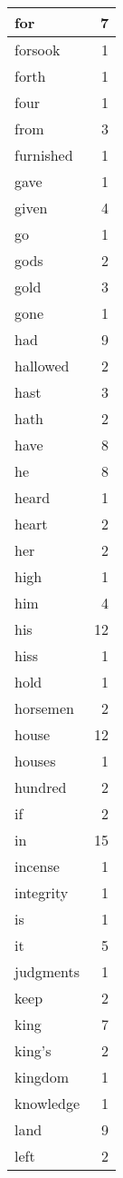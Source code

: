 \begin{center}
\begin{longtable}{l|r}
for & 7 \\ \hline
forsook & 1 \\ \hline
forth & 1 \\ \hline
four & 1 \\ \hline
from & 3 \\ \hline
furnished & 1 \\ \hline
gave & 1 \\ \hline
given & 4 \\ \hline
go & 1 \\ \hline
gods & 2 \\ \hline
gold & 3 \\ \hline
gone & 1 \\ \hline
had & 9 \\ \hline
hallowed & 2 \\ \hline
hast & 3 \\ \hline
hath & 2 \\ \hline
have & 8 \\ \hline
he & 8 \\ \hline
heard & 1 \\ \hline
heart & 2 \\ \hline
her & 2 \\ \hline
high & 1 \\ \hline
him & 4 \\ \hline
his & 12 \\ \hline
hiss & 1 \\ \hline
hold & 1 \\ \hline
horsemen & 2 \\ \hline
house & 12 \\ \hline
houses & 1 \\ \hline
hundred & 2 \\ \hline
if & 2 \\ \hline
in & 15 \\ \hline
incense & 1 \\ \hline
integrity & 1 \\ \hline
is & 1 \\ \hline
it & 5 \\ \hline
judgments & 1 \\ \hline
keep & 2 \\ \hline
king & 7 \\ \hline
king's & 2 \\ \hline
kingdom & 1 \\ \hline
knowledge & 1 \\ \hline
land & 9 \\ \hline
left & 2 \\ \hline

\end{longtable}
\end{center}
